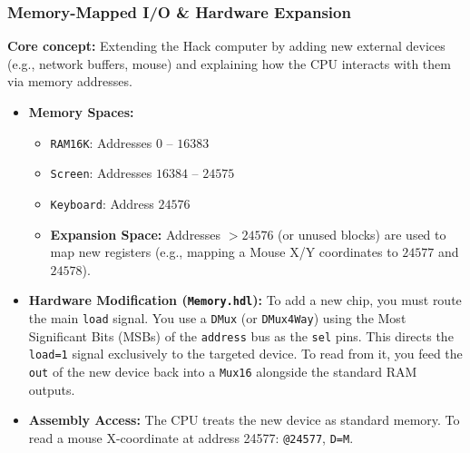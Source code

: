 \documentclass[12pt,a4paper]{article}
\begin{document}
\subsubsection*{Memory-Mapped I/O \& Hardware Expansion}
\textbf{Core concept:} Extending the Hack computer by adding new external devices (e.g., network buffers, mouse) and explaining how the CPU interacts with them via memory addresses.
\begin{itemize}
    \item \textbf{Memory Spaces:} 
    \begin{itemize}
        \item \texttt{RAM16K}: Addresses $0$ -- $16383$
        \item \texttt{Screen}: Addresses $16384$ -- $24575$
        \item \texttt{Keyboard}: Address $24576$
        \item \textbf{Expansion Space:} Addresses $> 24576$ (or unused blocks) are used to map new registers (e.g., mapping a Mouse X/Y coordinates to $24577$ and $24578$).
    \end{itemize}
    \item \textbf{Hardware Modification (\texttt{Memory.hdl}):} To add a new chip, you must route the main \texttt{load} signal. You use a \texttt{DMux} (or \texttt{DMux4Way}) using the Most Significant Bits (MSBs) of the \texttt{address} bus as the \texttt{sel} pins. This directs the \texttt{load=1} signal exclusively to the targeted device. To read from it, you feed the \texttt{out} of the new device back into a \texttt{Mux16} alongside the standard RAM outputs.
    \item \textbf{Assembly Access:} The CPU treats the new device as standard memory. To read a mouse X-coordinate at address 24577: \texttt{@24577}, \texttt{D=M}.
\end{itemize}
\end{document}
